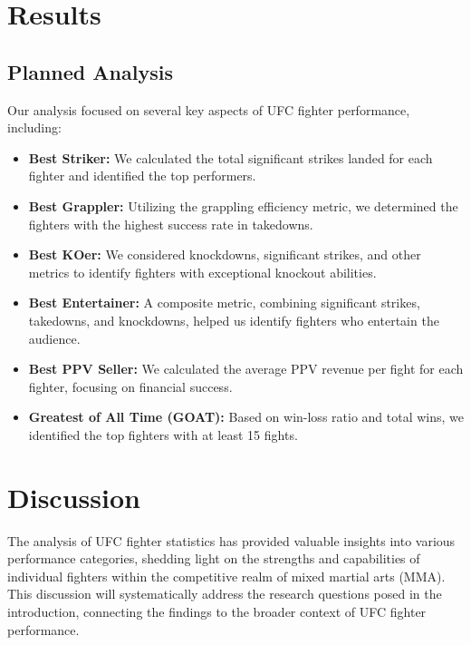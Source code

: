\documentclass[
  man,floatsintext]{apa6}
\begin{document}
\hypertarget{results}{%
\section{Results}\label{results}}

\hypertarget{planned-analysis}{%
\subsection{Planned Analysis}\label{planned-analysis}}

Our analysis focused on several key aspects of UFC fighter performance, including:

\begin{itemize}
\item
  \textbf{Best Striker:} We calculated the total significant strikes landed for each fighter and identified the top performers.
\item
  \textbf{Best Grappler:} Utilizing the grappling efficiency metric, we determined the fighters with the highest success rate in takedowns.
\item
  \textbf{Best KOer:} We considered knockdowns, significant strikes, and other metrics to identify fighters with exceptional knockout abilities.
\item
  \textbf{Best Entertainer:} A composite metric, combining significant strikes, takedowns, and knockdowns, helped us identify fighters who entertain the audience.
\item
  \textbf{Best PPV Seller:} We calculated the average PPV revenue per fight for each fighter, focusing on financial success.
\item
  \textbf{Greatest of All Time (GOAT):} Based on win-loss ratio and total wins, we identified the top fighters with at least 15 fights.
\end{itemize}

\hypertarget{discussion}{%
\section{Discussion}\label{discussion}}

The analysis of UFC fighter statistics has provided valuable insights into various performance categories, shedding light on the strengths and capabilities of individual fighters within the competitive realm of mixed martial arts (MMA). This discussion will systematically address the research questions posed in the introduction, connecting the findings to the broader context of UFC fighter performance.
\end{document}
